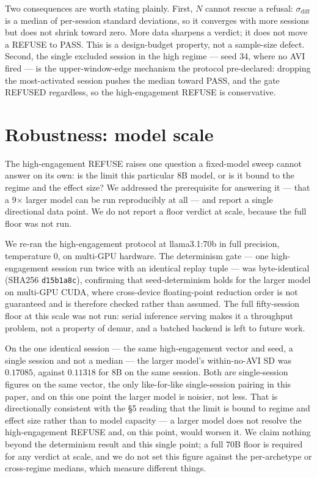 \documentclass{article}
\begin{document}
Two consequences are worth stating plainly. First, $N$ cannot rescue a refusal: $\sigma_{\mathrm{diff}}$ is a median of per-session standard deviations, so it converges with more sessions but does not shrink toward zero. More data sharpens a verdict; it does not move a REFUSE to PASS. This is a design-budget property, not a sample-size defect. Second, the single excluded session in the high regime --- seed 34, where no AVI fired --- is the upper-window-edge mechanism the protocol pre-declared: dropping the most-activated session pushes the median toward PASS, and the gate REFUSED regardless, so the high-engagement REFUSE is conservative.

\section{Robustness: model scale}

The high-engagement REFUSE raises one question a fixed-model sweep cannot answer on its own: is the limit this particular 8B model, or is it bound to the regime and the effect size? We addressed the prerequisite for answering it --- that a 9$\times$ larger model can be run reproducibly at all --- and report a single directional data point. We do not report a floor verdict at scale, because the full floor was not run.

We re-ran the high-engagement protocol at llama3.1:70b in full precision, temperature 0, on multi-GPU hardware. The determinism gate --- one high-engagement session run twice with an identical replay tuple --- was byte-identical (SHA256 \texttt{d15b1a8c}), confirming that seed-determinism holds for the larger model on multi-GPU CUDA, where cross-device floating-point reduction order is not guaranteed and is therefore checked rather than assumed. The full fifty-session floor at this scale was not run: serial inference serving makes it a throughput problem, not a property of demur, and a batched backend is left to future work.

On the one identical session --- the same high-engagement vector and seed, a single session and not a median --- the larger model's within-no-AVI SD was $0.17085$, against $0.11318$ for 8B on the same session. Both are single-session figures on the same vector, the only like-for-like single-session pairing in this paper, and on this one point the larger model is noisier, not less. That is directionally consistent with the §5 reading that the limit is bound to regime and effect size rather than to model capacity --- a larger model does not resolve the high-engagement REFUSE and, on this point, would worsen it. We claim nothing beyond the determinism result and this single point; a full 70B floor is required for any verdict at scale, and we do not set this figure against the per-archetype or cross-regime medians, which measure different things.
\end{document}
